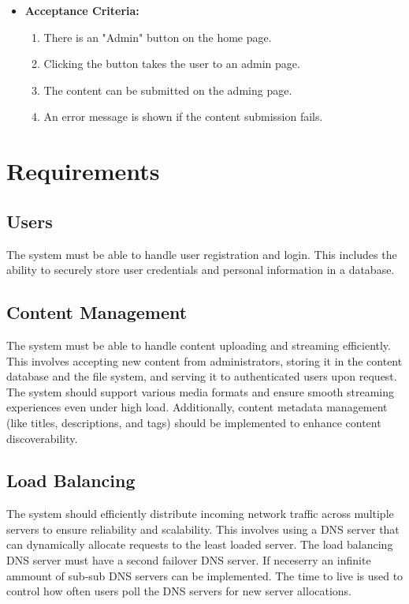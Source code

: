 \documentclass[12pt]{article}
\begin{document}
\begin{itemize}[label={}]
    \item \textbf{Acceptance Criteria:}
    \begin{enumerate}
        \item There is an "Admin" button on the home page.
        \item Clicking the button takes the user to an admin page.
        \item The content can be submitted on the adming page.
        \item An error message is shown if the content submission fails.
    \end{enumerate}
\end{itemize}

\section{Requirements}
\subsection{Users}
The system must be able to handle user registration and login. 
This includes the ability to securely store user credentials and personal information in a database. 

\subsection{Content Management}
The system must be able to handle content uploading and streaming efficiently. 
This involves accepting new content from administrators, 
storing it in the content database and the file system, 
and serving it to authenticated users upon request. 
The system should support various media formats and ensure smooth streaming experiences even under high load. 
Additionally, content metadata management (like titles, descriptions, and tags) 
should be implemented to enhance content discoverability.

\subsection{Load Balancing}
The system should efficiently distribute incoming network traffic across multiple 
servers to ensure reliability and scalability. 
This involves using a DNS server that can dynamically allocate 
requests to the least loaded server. The load balancing DNS server
must have a second failover DNS server. If neceserry an infinite ammount of 
sub-sub DNS servers can be implemented. The time to live is used to control how often users poll the DNS servers for
new server allocations.
\end{document}
